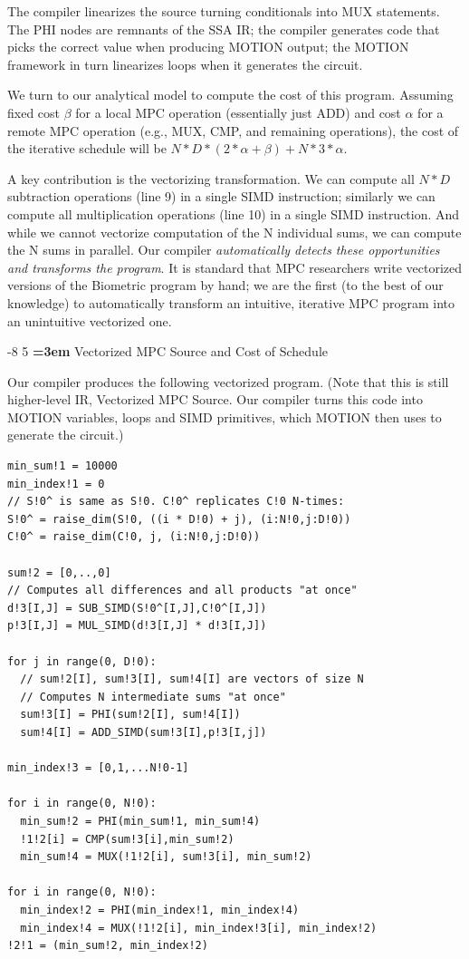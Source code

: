 \documentclass[sigconf, screen, natbib=false, dvipsnames, table]{acmart}
\makeatletter
\renewcommand{\subsection}{\@startsection{subsection}{2}{\z@}%
                        {-8\p@ \@plus -4\p@ \@minus -4\p@}%
                        {5\p@ \@plus 2\p@ \@minus 2\p@}%
                        {\normalfont\Large\bfseries\boldmath
                         \rightskip=\z@ \@plus 3em\pretolerance=10000 }}
\theoremstyle{definition}
\makeatother
\begin{document}
The compiler linearizes the source turning conditionals into MUX statements. The PHI nodes
are remnants of the SSA IR; the compiler generates code that picks the correct value 
when producing MOTION output; the MOTION framework in turn linearizes 
loops when it generates the circuit.

We turn to our analytical model to compute the cost of this program. Assuming fixed 
cost $\beta$ for a local MPC operation (essentially just ADD) and cost $\alpha$ for a remote
MPC operation (e.g., MUX, CMP, and remaining operations), the cost of the iterative schedule 
will be $N*D*(2*\alpha+\beta) + N*3*\alpha$. 

A key contribution is the vectorizing transformation. We can compute all $N*D$ 
subtraction operations (line 9) in a single SIMD instruction; similarly we can compute 
all multiplication operations (line 10) in a single SIMD instruction. And while we cannot
vectorize computation of the N individual sums, we can compute the N sums in parallel. 
Our compiler \emph{automatically detects these opportunities and transforms the program}. 
It is standard that MPC researchers write vectorized versions of the Biometric
program by hand; we are the first (to the best of our knowledge) to automatically 
transform an intuitive, iterative MPC program into an unintuitive vectorized one.

\subsection{Vectorized MPC Source and Cost of Schedule}

Our compiler produces the following vectorized program. (Note that this is
still higher-level IR, Vectorized MPC Source. Our compiler turns this code into MOTION variables, 
loops and SIMD primitives, which MOTION then uses to generate the circuit.)

{\small
\begin{verbatim}
min_sum!1 = 10000
min_index!1 = 0
// S!0^ is same as S!0. C!0^ replicates C!0 N-times: 
S!0^ = raise_dim(S!0, ((i * D!0) + j), (i:N!0,j:D!0))
C!0^ = raise_dim(C!0, j, (i:N!0,j:D!0))

sum!2 = [0,..,0]
// Computes all differences and all products "at once"
d!3[I,J] = SUB_SIMD(S!0^[I,J],C!0^[I,J])
p!3[I,J] = MUL_SIMD(d!3[I,J] * d!3[I,J])

for j in range(0, D!0):
  // sum!2[I], sum!3[I], sum!4[I] are vectors of size N  
  // Computes N intermediate sums "at once"
  sum!3[I] = PHI(sum!2[I], sum!4[I])       
  sum!4[I] = ADD_SIMD(sum!3[I],p!3[I,j])

min_index!3 = [0,1,...N!0-1]   

for i in range(0, N!0):
  min_sum!2 = PHI(min_sum!1, min_sum!4) 
  !1!2[i] = CMP(sum!3[i],min_sum!2)
  min_sum!4 = MUX(!1!2[i], sum!3[i], min_sum!2)
    
for i in range(0, N!0):
  min_index!2 = PHI(min_index!1, min_index!4)  
  min_index!4 = MUX(!1!2[i], min_index!3[i], min_index!2)
!2!1 = (min_sum!2, min_index!2)   
\end{verbatim}
}
\end{document}
